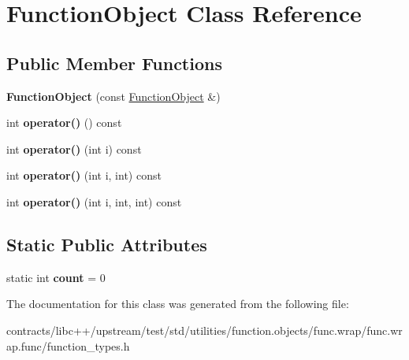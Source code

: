 \hypertarget{class_function_object}{}\section{Function\+Object Class Reference}
\label{class_function_object}
\subsection*{Public Member Functions}
\begin{DoxyCompactItemize}
\item 
\mbox{\label{class_function_object_a663450e9c685772e4c6cc7994419df41}} 
{\bfseries Function\+Object} (const \mbox{\hyperlink{class_function_object}{Function\+Object}} \&)
\item 
\mbox{\label{class_function_object_a33c5d4fa6acc0d93078a3e0a26f20e94}} 
int {\bfseries operator()} () const
\item 
\mbox{\label{class_function_object_a2c7cd51fce6af356d3af9f89b97b2f7f}} 
int {\bfseries operator()} (int i) const
\item 
\mbox{\label{class_function_object_ad9cc35a68dca17da746b428ffddb79cc}} 
int {\bfseries operator()} (int i, int) const
\item 
\mbox{\label{class_function_object_a8c88f8288c13d97d7960e286d27ecd28}} 
int {\bfseries operator()} (int i, int, int) const
\end{DoxyCompactItemize}
\subsection*{Static Public Attributes}
\begin{DoxyCompactItemize}
\item 
\mbox{\label{class_function_object_a3ef98eb348f345ab6032d4e9bacf47fd}} 
static int {\bfseries count} = 0
\end{DoxyCompactItemize}


The documentation for this class was generated from the following file\+:\begin{DoxyCompactItemize}
\item 
contracts/libc++/upstream/test/std/utilities/function.\+objects/func.\+wrap/func.\+wrap.\+func/function\+\_\+types.\+h\end{DoxyCompactItemize}
